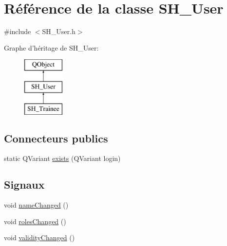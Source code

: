\hypertarget{classSH__User}{\section{Référence de la classe S\-H\-\_\-\-User}
\label{classSH__User}
}


{\ttfamily \#include $<$S\-H\-\_\-\-User.\-h$>$}

Graphe d'héritage de S\-H\-\_\-\-User\-:\begin{figure}[H]
\begin{center}
\leavevmode
\includegraphics[height=3.000000cm]{classSH__User}
\end{center}
\end{figure}
\subsection*{Connecteurs publics}
\begin{DoxyCompactItemize}
\item 
static Q\-Variant \hyperlink{classSH__User_aeefcf386df717163d07e17c48205814b}{exists} (Q\-Variant login)
\end{DoxyCompactItemize}
\subsection*{Signaux}
\begin{DoxyCompactItemize}
\item 
void \hyperlink{classSH__User_a02445292383053e7413df52ad89dad21}{name\-Changed} ()
\item 
void \hyperlink{classSH__User_aa6c441f9147186a7af987cd600c3ac33}{roles\-Changed} ()
\item 
void \hyperlink{classSH__User_a2b36efbf2a2127f7c6ab98c112d49dc0}{validity\-Changed} ()
\end{DoxyCompactItemize}
